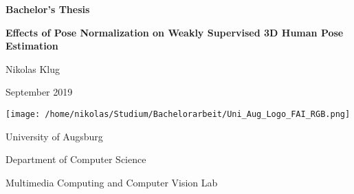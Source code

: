 \begin{titlepage}
	\centering
	
	\large{\textbf{Bachelor's Thesis}}
	\vspace{0.4cm}
	
	\huge{\textbf{Effects of Pose Normalization on Weakly Supervised 3D Human Pose Estimation}}\par
	
	\vspace{1cm}
	\Large{Nikolas Klug}
	
	\vspace{1cm}
	\Large{September 2019}
	
	\vspace{\fill}
	\texttt{[image: /home/nikolas/Studium/Bachelorarbeit/Uni\_Aug\_Logo\_FAI\_RGB.png]}
	\vspace{5mm}
	
	University of Augsburg
	
	Department of Computer Science
	
	Multimedia Computing and Computer Vision Lab
\end{titlepage}

\normalfont
\restoregeometry
\pagebreak

